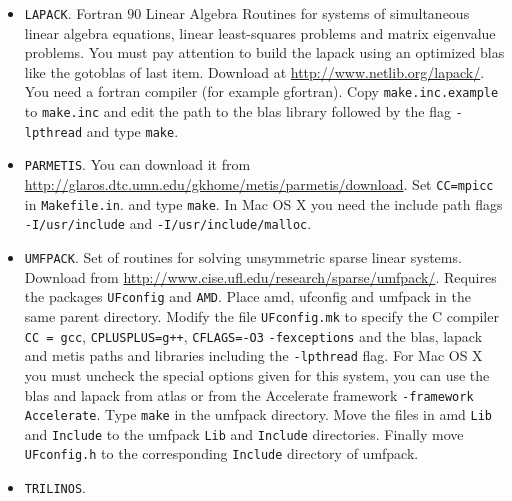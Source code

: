 \begin{itemize}
\item \verb!LAPACK!.
Fortran $90$ Linear Algebra Routines for systems of simultaneous linear algebra equations, linear least-squares problems
and matrix eigenvalue problems. You must pay attention to build the lapack using an optimized blas like the gotoblas of
last item. Download at \url{http://www.netlib.org/lapack/}. You need a fortran compiler (for example gfortran).
Copy \verb!make.inc.example! to \verb!make.inc! and edit the path to the blas library followed by the flag \verb!-lpthread!
and type \verb!make!.

\item \verb!PARMETIS!.
You can download it from \url{http://glaros.dtc.umn.edu/gkhome/metis/parmetis/download}. Set \verb!CC=mpicc!
in \verb!Makefile.in!. and type \verb!make!. In Mac OS X you need the include path flags
\verb!-I/usr/include! and \verb!-I/usr/include/malloc!.

\item \verb!UMFPACK!.
Set of routines for solving unsymmetric sparse linear systems.
Download from \url{http://www.cise.ufl.edu/research/sparse/umfpack/}. Requires
the packages \verb!UFconfig! and \verb!AMD!. Place amd, ufconfig and umfpack in the same parent directory.
Modify the file \verb!UFconfig.mk! to specify the C compiler \verb!CC = gcc!, \verb!CPLUSPLUS=g++!,
\verb!CFLAGS=-O3!
\verb!-fexceptions!
and the blas, lapack and metis paths and libraries including the \verb!-lpthread! flag.
For Mac OS X you must uncheck the special options given for this system, you can use the blas and lapack
from atlas or from the Accelerate framework \verb!-framework Accelerate!.
Type \verb!make! in
the umfpack directory. Move the files in amd \verb!Lib! and \verb!Include! to the umfpack \verb!Lib! and \verb!Include! directories.
Finally move \verb!UFconfig.h! to the corresponding \verb!Include! directory of umfpack.

\item \verb!TRILINOS!.

\end{itemize}



